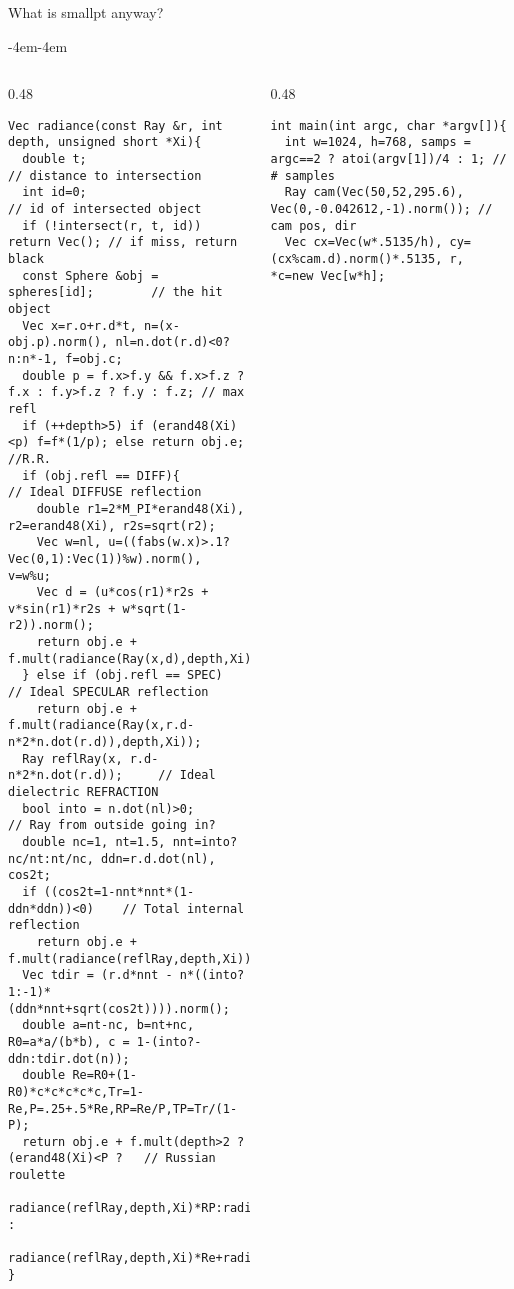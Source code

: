 \documentclass[8pt]{beamer}
\begin{document}
\begin{frame}[fragile]{What is smallpt anyway?}
\begin{adjustwidth}{-4em}{-4em}
\begin{columns}
\begin{column}{0.48 \textwidth}
{\tiny
\begin{verbatim}
Vec radiance(const Ray &r, int depth, unsigned short *Xi){ 
  double t;                               // distance to intersection 
  int id=0;                               // id of intersected object 
  if (!intersect(r, t, id)) return Vec(); // if miss, return black 
  const Sphere &obj = spheres[id];        // the hit object 
  Vec x=r.o+r.d*t, n=(x-obj.p).norm(), nl=n.dot(r.d)<0?n:n*-1, f=obj.c; 
  double p = f.x>f.y && f.x>f.z ? f.x : f.y>f.z ? f.y : f.z; // max refl 
  if (++depth>5) if (erand48(Xi)<p) f=f*(1/p); else return obj.e; //R.R. 
  if (obj.refl == DIFF){                  // Ideal DIFFUSE reflection 
    double r1=2*M_PI*erand48(Xi), r2=erand48(Xi), r2s=sqrt(r2); 
    Vec w=nl, u=((fabs(w.x)>.1?Vec(0,1):Vec(1))%w).norm(), v=w%u; 
    Vec d = (u*cos(r1)*r2s + v*sin(r1)*r2s + w*sqrt(1-r2)).norm(); 
    return obj.e + f.mult(radiance(Ray(x,d),depth,Xi)); 
  } else if (obj.refl == SPEC)            // Ideal SPECULAR reflection 
    return obj.e + f.mult(radiance(Ray(x,r.d-n*2*n.dot(r.d)),depth,Xi)); 
  Ray reflRay(x, r.d-n*2*n.dot(r.d));     // Ideal dielectric REFRACTION 
  bool into = n.dot(nl)>0;                // Ray from outside going in? 
  double nc=1, nt=1.5, nnt=into?nc/nt:nt/nc, ddn=r.d.dot(nl), cos2t; 
  if ((cos2t=1-nnt*nnt*(1-ddn*ddn))<0)    // Total internal reflection 
    return obj.e + f.mult(radiance(reflRay,depth,Xi)); 
  Vec tdir = (r.d*nnt - n*((into?1:-1)*(ddn*nnt+sqrt(cos2t)))).norm(); 
  double a=nt-nc, b=nt+nc, R0=a*a/(b*b), c = 1-(into?-ddn:tdir.dot(n)); 
  double Re=R0+(1-R0)*c*c*c*c*c,Tr=1-Re,P=.25+.5*Re,RP=Re/P,TP=Tr/(1-P); 
  return obj.e + f.mult(depth>2 ? (erand48(Xi)<P ?   // Russian roulette 
    radiance(reflRay,depth,Xi)*RP:radiance(Ray(x,tdir),depth,Xi)*TP) : 
    radiance(reflRay,depth,Xi)*Re+radiance(Ray(x,tdir),depth,Xi)*Tr); 
} 
\end{verbatim}
 }
\end{column}
\begin{column}{0.48 \textwidth}
{\tiny
\begin{verbatim}
int main(int argc, char *argv[]){ 
  int w=1024, h=768, samps = argc==2 ? atoi(argv[1])/4 : 1; // # samples 
  Ray cam(Vec(50,52,295.6), Vec(0,-0.042612,-1).norm()); // cam pos, dir 
  Vec cx=Vec(w*.5135/h), cy=(cx%cam.d).norm()*.5135, r, *c=new Vec[w*h]; 

\end{verbatim}}
\end{column}
\end{columns}
\end{adjustwidth}
\end{frame}
\end{document}
